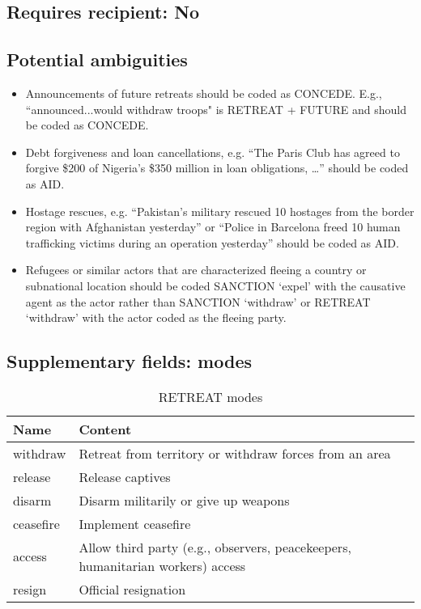 \documentclass[11pt]{report}
\newcommand{\plcat}[1]{\textsf{#1}}
\begin{document}
\subsection{Requires recipient: No}

\subsection{Potential ambiguities}

\begin{itemize}
\item Announcements of future retreats should be coded as \plcat{CONCEDE}. E.g., ``announced...would withdraw troops" is \plcat{RETREAT} + \plcat{FUTURE} and should be coded as \plcat{CONCEDE}.
\item Debt forgiveness and loan cancellations, e.g. ``The Paris Club has agreed to forgive \$200 of Nigeria’s \$350 million in loan obligations, \dots'' should be coded as \plcat{AID}.
\item Hostage rescues, e.g. ``Pakistan’s military rescued 10 hostages from the border region with Afghanistan yesterday'' or ``Police in Barcelona freed 10 human trafficking victims during an operation yesterday'' should be coded as \plcat{AID}.
\item Refugees or similar actors that are characterized fleeing a country or subnational location should be coded \plcat{SANCTION} `expel' with the causative agent as the actor rather than \plcat{SANCTION} `withdraw' or \plcat{RETREAT} `withdraw' with the actor coded as the fleeing party.
\end{itemize}

\subsection{Supplementary fields: modes}

\begin{table}[htp]
\caption{RETREAT modes}
\begin{center}
\begin{tabular}{|l|p{13cm}|}
\hline
Name & Content \\
\hline
withdraw & Retreat from territory or withdraw forces from an area\\
release & Release captives \\
disarm & Disarm militarily or give up weapons\\
ceasefire & Implement ceasefire\\
access & Allow third party (e.g., observers, peacekeepers, humanitarian workers) access \\
resign & Official resignation \\
\hline
\end{tabular}
\end{center}
\label{tab:retreatmode}
\end{table}%
\end{document}
